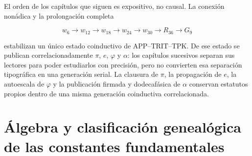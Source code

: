 


El orden de los capítulos que siguen es expositivo, no causal. La conexión
nonádica y la prolongación completa

\[
w_6\longrightarrow w_{12}\longrightarrow w_{18}\longrightarrow w_{24}
\longrightarrow w_{30}\longrightarrow R_{36}\longrightarrow G_9
\]

estabilizan un único estado coinductivo de APP--TRIT--TPK. De ese estado se
publican correlacionadamente \(\pi\), \(e\), \(\varphi\) y \(\alpha\): los
capítulos sucesivos separan sus lectores para poder estudiarlos con precisión,
pero no convierten esa separación tipográfica en una generación serial. La
clausura de \(\pi\), la propagación de \(e\), la autoescala de \(\varphi\) y
la publicación firmada y dodecafásica de \(\alpha\) conservan estatutos
propios dentro de una misma generación coinductiva correlacionada.

\newcommand{\HMTSuccessorChapterInput}[2]{%
  \chapter{#1}%
  \begingroup
  \renewcommand{\chapter}[2][]{}%
  \endgroup}

\HMTFlushCurrentChapter
\HMTSuccessorChapterInput
  {Álgebra y clasificación genealógica de las constantes fundamentales}
  {../colaboracion/parte_iii/tex/capitulos_finales/27_algebra_clasificacion.tex}

\begin{HMTScientificOwnerSubordinated}



\end{HMTScientificOwnerSubordinated}

